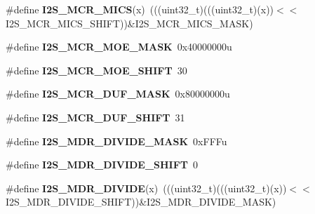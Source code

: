 \begin{DoxyCompactItemize}
\item 
\#define {\bfseries I2\+S\+\_\+\+M\+C\+R\+\_\+\+M\+I\+CS}(x)~(((uint32\+\_\+t)(((uint32\+\_\+t)(x))$<$$<$I2\+S\+\_\+\+M\+C\+R\+\_\+\+M\+I\+C\+S\+\_\+\+S\+H\+I\+FT))\&I2\+S\+\_\+\+M\+C\+R\+\_\+\+M\+I\+C\+S\+\_\+\+M\+A\+SK)\hypertarget{group__I2S__Register__Masks_gaaf72b03378aedd558df1c74b19d73f61}{}\label{group__I2S__Register__Masks_gaaf72b03378aedd558df1c74b19d73f61}

\item 
\#define {\bfseries I2\+S\+\_\+\+M\+C\+R\+\_\+\+M\+O\+E\+\_\+\+M\+A\+SK}~0x40000000u\hypertarget{group__I2S__Register__Masks_ga03150d6df8ff9955e1f8175ef1ebd1ab}{}\label{group__I2S__Register__Masks_ga03150d6df8ff9955e1f8175ef1ebd1ab}

\item 
\#define {\bfseries I2\+S\+\_\+\+M\+C\+R\+\_\+\+M\+O\+E\+\_\+\+S\+H\+I\+FT}~30\hypertarget{group__I2S__Register__Masks_ga9e216aa29a6bff56351f468e127fbea5}{}\label{group__I2S__Register__Masks_ga9e216aa29a6bff56351f468e127fbea5}

\item 
\#define {\bfseries I2\+S\+\_\+\+M\+C\+R\+\_\+\+D\+U\+F\+\_\+\+M\+A\+SK}~0x80000000u\hypertarget{group__I2S__Register__Masks_ga215e9b824f46df65ca2fc57784148cae}{}\label{group__I2S__Register__Masks_ga215e9b824f46df65ca2fc57784148cae}

\item 
\#define {\bfseries I2\+S\+\_\+\+M\+C\+R\+\_\+\+D\+U\+F\+\_\+\+S\+H\+I\+FT}~31\hypertarget{group__I2S__Register__Masks_gae490aa013a4b379ce12be811ae32a148}{}\label{group__I2S__Register__Masks_gae490aa013a4b379ce12be811ae32a148}

\item 
\#define {\bfseries I2\+S\+\_\+\+M\+D\+R\+\_\+\+D\+I\+V\+I\+D\+E\+\_\+\+M\+A\+SK}~0x\+F\+F\+Fu\hypertarget{group__I2S__Register__Masks_ga3b44d8acfaecde14d97877635d471e13}{}\label{group__I2S__Register__Masks_ga3b44d8acfaecde14d97877635d471e13}

\item 
\#define {\bfseries I2\+S\+\_\+\+M\+D\+R\+\_\+\+D\+I\+V\+I\+D\+E\+\_\+\+S\+H\+I\+FT}~0\hypertarget{group__I2S__Register__Masks_ga96fc58c33527f6dba2be28151ecdb6b2}{}\label{group__I2S__Register__Masks_ga96fc58c33527f6dba2be28151ecdb6b2}

\item 
\#define {\bfseries I2\+S\+\_\+\+M\+D\+R\+\_\+\+D\+I\+V\+I\+DE}(x)~(((uint32\+\_\+t)(((uint32\+\_\+t)(x))$<$$<$I2\+S\+\_\+\+M\+D\+R\+\_\+\+D\+I\+V\+I\+D\+E\+\_\+\+S\+H\+I\+FT))\&I2\+S\+\_\+\+M\+D\+R\+\_\+\+D\+I\+V\+I\+D\+E\+\_\+\+M\+A\+SK)\hypertarget{group__I2S__Register__Masks_ga12b79478094d1367a54d08fd0372546d}{}\label{group__I2S__Register__Masks_ga12b79478094d1367a54d08fd0372546d}


\end{DoxyCompactItemize}
